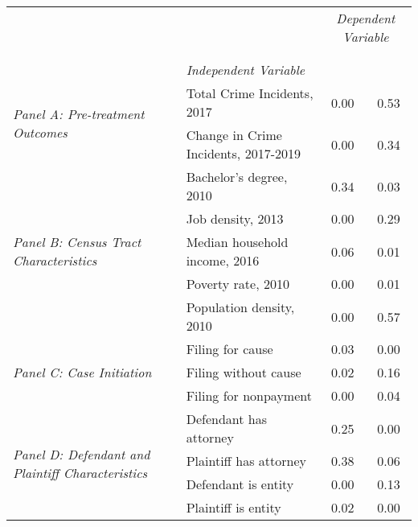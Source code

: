 \begin{tabular}{llcc}
\toprule
 &  & \multicolumn{2}{c}{\textit{Dependent Variable}} \\
\cline{3-4}
\\
 &  &  &  \\
 & \emph{Independent Variable} &  &  \\
\midrule
\multirow[c]{2}{3cm}{\textit{Panel A: Pre-treatment Outcomes}} & Total Crime Incidents, 2017 & 0.00 & 0.53 \\
 & Change in Crime Incidents, 2017-2019 & 0.00 & 0.34 \\
\cline{1-4}
\multirow[c]{5}{3cm}{\textit{Panel B: Census Tract Characteristics}} & Bachelor's degree, 2010 & 0.34 & 0.03 \\
 & Job density, 2013 & 0.00 & 0.29 \\
 & Median household income, 2016 & 0.06 & 0.01 \\
 & Poverty rate, 2010 & 0.00 & 0.01 \\
 & Population density, 2010 & 0.00 & 0.57 \\
\cline{1-4}
\multirow[c]{3}{3cm}{\textit{Panel C: Case Initiation}} & Filing for cause & 0.03 & 0.00 \\
 & Filing without cause & 0.02 & 0.16 \\
 & Filing for nonpayment & 0.00 & 0.04 \\
\cline{1-4}
\multirow[c]{4}{3cm}{\textit{Panel D: Defendant and Plaintiff Characteristics}} & Defendant has attorney & 0.25 & 0.00 \\
 & Plaintiff has attorney & 0.38 & 0.06 \\
 & Defendant is entity & 0.00 & 0.13 \\
 & Plaintiff is entity & 0.02 & 0.00 \\
\cline{1-4}
\bottomrule
\end{tabular}
